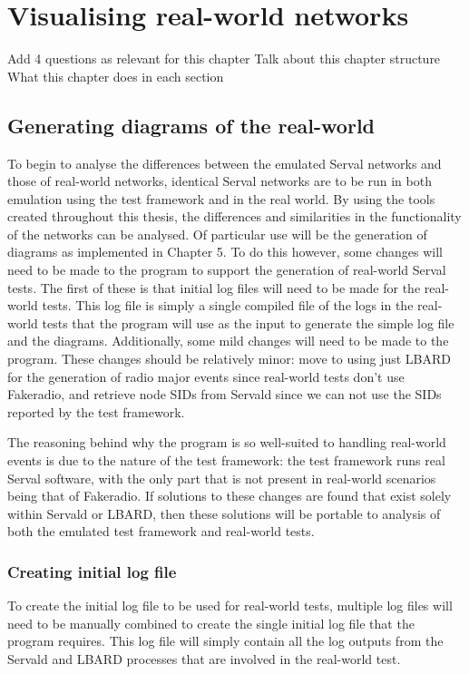 
\chapter{Visualising real-world networks} %

\label{Chapter6} %

Add 4 questions as relevant for this chapter
Talk about this chapter structure
What this chapter does in each section

\section{Generating diagrams of the real-world}   
To begin to analyse the differences between the emulated Serval networks and those of real-world networks, identical Serval networks are to be run in both emulation using the test framework and in the real world.
By using the tools created throughout this thesis, the differences and similarities in the functionality of the networks can be analysed.
Of particular use will be the generation of diagrams as implemented in Chapter 5.
To do this however, some changes will need to be made to the program to support the generation of real-world Serval tests.
The first of these is that initial log files will need to be made for the real-world tests.
This log file is simply a single compiled file of the logs in the real-world tests that the program will use as the input to generate the simple log file and the diagrams.
Additionally, some mild changes will need to be made to the program. 
These changes should be relatively minor: move to using just LBARD for the generation of radio major events since real-world tests don't use Fakeradio, and retrieve node SIDs from Servald since we can not use the SIDs reported by the test framework.

The reasoning behind why the program is so well-suited to handling real-world events is due to the nature of the test framework: the test framework runs real Serval software, with the only part that is not present in real-world scenarios being that of Fakeradio.
If solutions to these changes are found that exist solely within Servald or LBARD, then these solutions will be portable to analysis of both the emulated test framework and real-world tests.

\subsection{Creating initial log file}
To create the initial log file to be used for real-world tests, multiple log files will need to be manually combined to create the single initial log file that the program requires.
This log file will simply contain all the log outputs from the Servald and LBARD processes that are involved in the real-world test.

